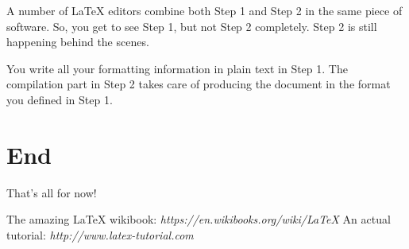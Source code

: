 \documentclass[12pt]{article}
\begin{document}
A number of LaTeX editors combine both Step 1 and Step 2 in the same piece of
software. So, you get to see Step 1, but not Step 2 completely.
Step 2 is still happening behind the scenes.

You write all your formatting information in plain text in Step 1.
The compilation part in Step 2 takes care of producing the document in the
format you defined in Step 1.

\section{End}

That's all for now!

\begin{thebibliography}{1}
   The amazing LaTeX wikibook: {\em https://en.wikibooks.org/wiki/LaTeX}
   An actual tutorial: {\em http://www.latex-tutorial.com}
\end{thebibliography}

\end{document}
